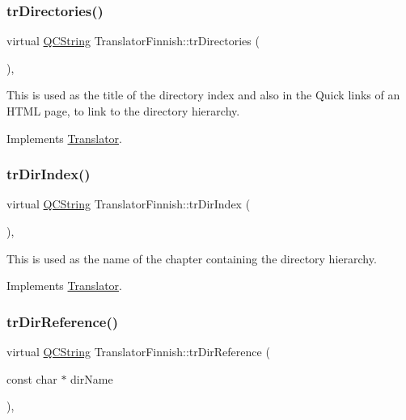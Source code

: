 \subsubsection{\texorpdfstring{trDirectories()}{trDirectories()}}
{\footnotesize\ttfamily virtual \mbox{\hyperlink{class_q_c_string}{Q\+C\+String}} Translator\+Finnish\+::tr\+Directories (\begin{DoxyParamCaption}{ }\end{DoxyParamCaption})\hspace{0.3cm}{\ttfamily [inline]}, {\ttfamily [virtual]}}

This is used as the title of the directory index and also in the Quick links of an H\+T\+ML page, to link to the directory hierarchy. 

Implements \mbox{\hyperlink{class_translator}{Translator}}.

\mbox{\label{class_translator_finnish_a97c0ffc938be627b8d63a5f56e566a05}} 
\subsubsection{\texorpdfstring{trDirIndex()}{trDirIndex()}}
{\footnotesize\ttfamily virtual \mbox{\hyperlink{class_q_c_string}{Q\+C\+String}} Translator\+Finnish\+::tr\+Dir\+Index (\begin{DoxyParamCaption}{ }\end{DoxyParamCaption})\hspace{0.3cm}{\ttfamily [inline]}, {\ttfamily [virtual]}}

This is used as the name of the chapter containing the directory hierarchy. 

Implements \mbox{\hyperlink{class_translator}{Translator}}.

\mbox{\label{class_translator_finnish_aa8f927a6ae4b40d0cbfebed11eafedd6}} 
\subsubsection{\texorpdfstring{trDirReference()}{trDirReference()}}
{\footnotesize\ttfamily virtual \mbox{\hyperlink{class_q_c_string}{Q\+C\+String}} Translator\+Finnish\+::tr\+Dir\+Reference (\begin{DoxyParamCaption}\item[{const char $\ast$}]{dir\+Name }\end{DoxyParamCaption})\hspace{0.3cm}{\ttfamily [inline]}, {\ttfamily [virtual]}}

